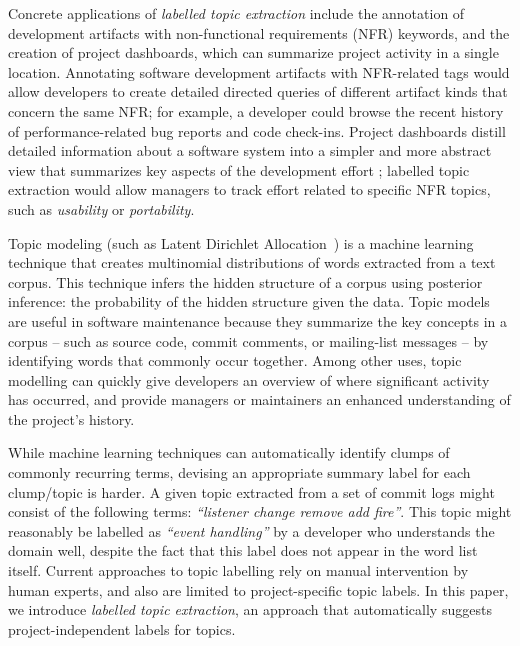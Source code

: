 \documentclass[smallextended]{svjour3}       %
\begin{document}
Concrete applications of \emph{labelled topic extraction} include the annotation of development artifacts with non-functional requirements (NFR) keywords, and the creation of project dashboards, which can summarize project activity in a single location.  Annotating software development artifacts with NFR-related tags would allow developers to create detailed directed queries of different artifact kinds that concern the same NFR; for example, a developer could browse the recent history of performance-related bug reports and code check-ins. Project dashboards distill detailed information about a software system into a simpler and more abstract view that summarizes key aspects of the development effort \cite{dashboard}; labelled topic extraction would allow managers to track effort related to specific NFR topics, such as \emph{usability} or \emph{portability}.


Topic modeling (such as Latent Dirichlet Allocation~\cite{Blei2003}) is a machine learning technique that creates
multinomial distributions of words extracted from a text corpus. 
This technique infers the hidden structure of a corpus using posterior
inference: the probability of the hidden structure given the data. 
Topic models are useful in software maintenance because they summarize
the key concepts in a corpus -- such as source code, commit comments, or
mailing-list messages -- by identifying words that commonly occur together. 
Among other uses, topic modelling can quickly give developers an overview of where significant
activity has occurred, and provide managers or maintainers an enhanced understanding of the project's 
history.

While machine learning techniques can automatically identify clumps of
commonly recurring terms, devising an appropriate summary label for
each clump/topic is harder.  
A given topic extracted from a set of commit logs might consist of the following terms: \emph{ ``listener change remove add fire''}. 
This topic might reasonably be labelled as
\emph{``event handling''} by a developer who understands the domain well,
despite the fact that this label does not appear in the word list itself.  
Current approaches to topic labelling rely on manual intervention by
human experts, and also are limited to project-specific topic labels.  
In this paper, we introduce \emph{labelled topic extraction}, an
approach that automatically suggests project-independent labels for topics.
\end{document}
